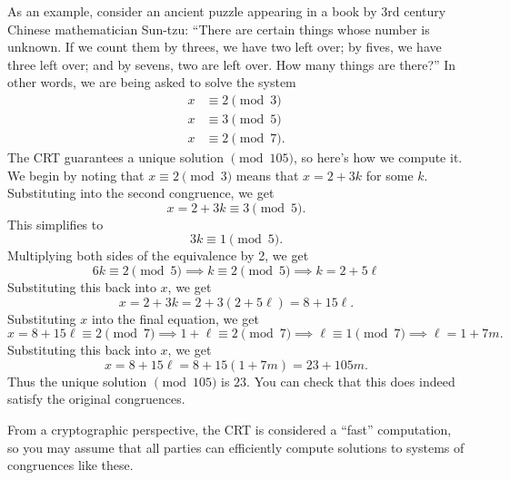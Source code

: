 \documentclass{article}
\begin{document}
        As an example, consider an ancient puzzle appearing in a book by 3rd century Chinese mathematician Sun-tzu:
        ``There are certain things whose number is unknown. 
        If we count them by threes, we have two left over; by fives, we have three left over; and by sevens, two are left over. 
        How many things are there?''
        In other words, we are being asked to solve the system
        \begin{align*}
            x &\equiv 2\pmod{3}\\
            x &\equiv 3\pmod{5}\\
            x &\equiv 2\pmod{7}.
        \end{align*}
        The CRT guarantees a unique solution \(\pmod{105}\), so here's how we compute it.
        We begin by noting that \(x\equiv 2\pmod 3\) means that \(x=2+3k\) for some \(k\).
        Substituting into the second congruence, we get 
        \[x=2+3k\equiv 3\pmod 5.\]
        This simplifies to
        \[3k\equiv 1\pmod 5.\]
        Multiplying both sides of the equivalence by 2, we get
        \[6k\equiv 2\pmod 5\implies k\equiv 2\pmod 5\implies k=2 + 5\ell\]
        Substituting this back into \(x\), we get 
        \[x = 2 + 3k = 2 + 3(2+5\ell) = 8 + 15\ell.\]
        Substituting \(x\) into the final equation, we get
        \[x = 8+15\ell\equiv 2\pmod 7\implies 1+\ell\equiv 2\pmod 7\implies \ell\equiv 1\pmod 7\implies \ell = 1+7m.\]
        Substituting this back into \(x\), we get
        \[x = 8 + 15\ell = 8 + 15(1+7m) = 23 + 105m.\]
        Thus the unique solution \(\pmod{105}\) is \(23\). 
        You can check that this does indeed satisfy the original congruences.

        From a cryptographic perspective, the CRT is considered a ``fast'' computation, so you may assume that all parties can efficiently compute solutions to systems of congruences like these.
\end{document}
